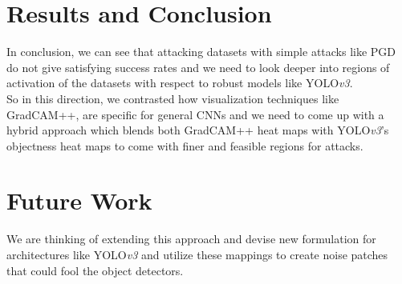 \documentclass[letterpaper]{article}
\begin{document}
\section{Results and Conclusion}
In conclusion, we can see that attacking datasets with simple attacks like PGD do not give satisfying success rates and we need to look deeper into regions of activation of the datasets with respect to robust models like YOLO\emph{v3}.\\
So in this direction, we contrasted how visualization techniques like GradCAM++, are specific for general CNNs and we need to come up with a hybrid approach which blends both GradCAM++ heat maps with YOLO\emph{v3}'s objectness heat maps to come with finer and feasible regions for attacks.\\
\section{Future Work}
We are thinking of extending this approach and devise new formulation for architectures like YOLO\emph{v3} and utilize these mappings to create noise patches that could fool the object detectors.
\printbibliography
\end{document}
